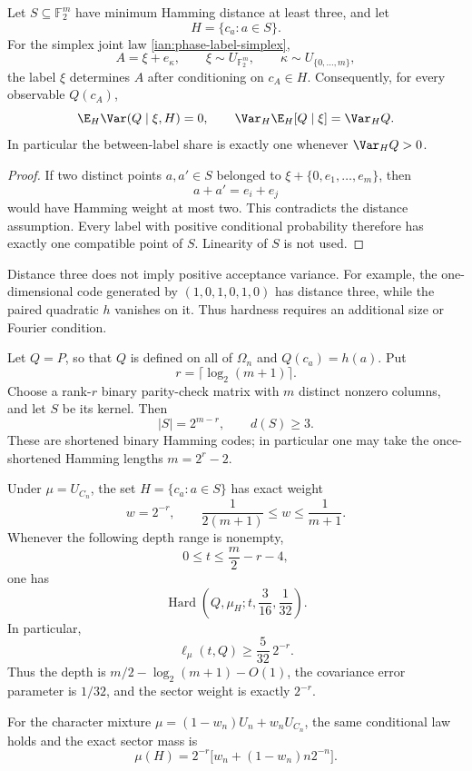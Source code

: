 \begin{proposition}
\label{ian:phase-label-distance-three-determination}
Let \(S\subseteq\mathbb F_2^m\) have minimum Hamming distance at least three, and let
\[
 H=\{c_a:a\in S\}.
\]
For the simplex joint law \eqref{ian:phase-label-simplex},
\[
 A=\xi+e_\kappa,\qquad
 \xi\sim U_{\mathbb F_2^m},\qquad
 \kappa\sim U_{\{0,\ldots,m\}},
\]
the label \(\xi\) determines \(A\) after conditioning on \(c_A\in H\). Consequently, for every observable \(Q(c_A)\),
\[
 \E_H\Var(Q\mid\xi,H)=0,\qquad
 \Var_H\E_H[Q\mid\xi]=\Var_H Q.
\]
In particular the between-label share is exactly one whenever \(\Var_H Q>0\).
\end{proposition}

\begin{proof}
If two distinct points \(a,a'\in S\) belonged to \(\xi+\{0,e_1,\ldots,e_m\}\), then
\[
 a+a'=e_i+e_j
\]
would have Hamming weight at most two. This contradicts the distance assumption. Every label with positive conditional probability therefore has exactly one compatible point of \(S\). Linearity of \(S\) is not used.
\end{proof}

Distance three does not imply positive acceptance variance. For example, the one-dimensional code generated by
\((1,0,1,0,1,0)\) has distance three, while the paired quadratic \(h\) vanishes on it. Thus hardness requires an additional size or Fourier condition.

\begin{proposition}
\label{ian:phase-label-hamming-sector}
Let \(Q=P\), so that \(Q\) is defined on all of \(\Omega_n\) and
\(Q(c_a)=h(a)\). Put
\[
 r=\lceil\log_2(m+1)\rceil.
\]
Choose a rank-\(r\) binary parity-check matrix with \(m\) distinct nonzero columns, and let \(S\) be its kernel. Then
\[
 |S|=2^{m-r},\qquad d(S)\ge3.
\]
These are shortened binary Hamming codes; in particular one may take the once-shortened Hamming lengths \(m=2^r-2\).

Under \(\mu=U_{C_n}\), the set \(H=\{c_a:a\in S\}\) has exact weight
\[
 w=2^{-r},\qquad
 \frac1{2(m+1)}\le w\le\frac1{m+1}.
\]
Whenever the following depth range is nonempty,
\[
 0\le t\le \frac m2-r-4,
\]
one has
\[
 \operatorname{Hard}
 \left(Q,\mu_H;t,\frac3{16},\frac1{32}\right).
\]
In particular,
\[
 \ell_\mu(t,Q)\ge\frac{5}{32}\,2^{-r}.
\]
Thus the depth is \(m/2-\log_2(m+1)-O(1)\), the covariance error parameter is \(1/32\), and the sector weight is exactly \(2^{-r}\).

For the character mixture
\(\mu=(1-w_n)U_n+w_nU_{C_n}\), the same conditional law holds and the exact sector mass is
\[
 \mu(H)=2^{-r}\bigl[w_n+(1-w_n)n2^{-n}\bigr].
\]
\end{proposition}

